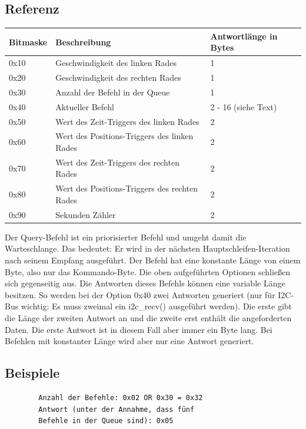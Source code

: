\documentclass[a4paper]{article}
\begin{document}
	\subsection{Referenz}

	\begin{tabularx}{\linewidth}{|l|l|X|}
		\hline
		\textbf{Bitmaske} & \textbf{Beschreibung} & \textbf{Antwortlänge in Bytes} \\
		\hline
		\hline
		0x10 				& Geschwindigkeit des linken Rades & 1 \\
		\hline
		0x20				& Geschwindigkeit des rechten Rades & 1 \\
		\hline
		0x30				& Anzahl der Befehl in der Queue & 1 \\
		\hline
		0x40				& Aktueller Befehl & 2 - 16 (siehe Text) \\
		\hline
		0x50              & Wert des Zeit-Triggers des linken Rades & 2 \\
		\hline
		0x60              & Wert des Positions-Triggers des linken Rades & 2 \\
		\hline
		0x70              & Wert des Zeit-Triggers des rechten Rades & 2 \\
		\hline
		0x80              & Wert des Positions-Triggers des rechten Rades & 2 \\
		\hline
		0x90              & Sekunden Zähler & 2 \\
		\hline
	\end{tabularx}

	Der Query-Befehl ist ein priorisierter Befehl und umgeht damit die
	Warteschlange. Das bedeutet: Er wird in der nächsten
	Hauptschleifen-Iteration nach seinem Empfang ausgeführt. Der Befehl
	hat eine konstante Länge von einem Byte, also nur das Kommando-Byte.
	Die oben aufgeführten Optionen schließen sich gegenseitig aus.
	Die Antworten dieses Befehls können eine variable Länge besitzen.
	So werden bei der Option 0x40 zwei Antworten generiert (nur für I2C-Bus
	wichtig: Es muss zweimal ein i2c\_recv() ausgeführt werden). Die erste
	gibt die Länge der zweiten Antwort an und die zweite erst enthält die
	angeforderten Daten. Die erste Antwort ist in diesem Fall aber immer
	ein Byte lang. Bei Befehlen mit konstanter Länge wird aber nur
	eine Antwort generiert.

	\subsection{Beispiele}

	\begin{verbatim}	
		Anzahl der Befehle: 0x02 OR 0x30 = 0x32
		Antwort (unter der Annahme, dass fünf
		Befehle in der Queue sind): 0x05
	\end{verbatim}
	\pagebreak
\end{document}
